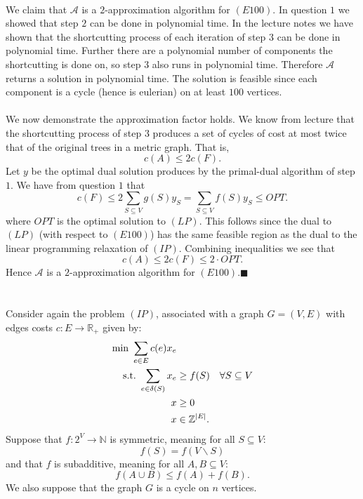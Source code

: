 \documentclass[letterpaper,12pt,oneside,onecolumn]{article}
\newcommand{\N}{\mathbb{N}} \newcommand{\R}{\mathbb{R}}
\newcommand{\cA}{\mathcal{A}} \newcommand{\cB}{\mathcal{B}}
\begin{document}
\paragraph{}
We claim that $\cA$ is a $2$-approximation algorithm for $(E100)$. In question $1$ we showed that step $2$ can be done in polynomial time. In the lecture notes we have shown that the shortcutting process of each iteration of step $3$ can be done in polynomial time. Further there are a polynomial number of components the shortcutting is done on, so step $3$ also runs in polynomial time. Therefore $\cA$ returns a solution in polynomial time. The solution is feasible since each component is a cycle (hence is eulerian) on at least $100$ vertices.
\paragraph{}
We now demonstrate the approximation factor holds. We know from lecture that the shortcutting process of step $3$ produces a set of cycles of cost at most twice that of the original trees in a metric graph. That is,
$$c(A)\leq 2c(F).$$
Let $y$ be the optimal dual solution produces by the primal-dual algorithm of step $1$. We have from question $1$ that
$$c(F) \leq 2\sum_{S\subseteq V} g(S) y_S = \sum_{S\subseteq V} f(S) y_S \leq OPT.$$
where $OPT$ is the optimal solution to $(LP)$. This follows since the dual to $(LP)$ (with respect to $(E100)$) has the same feasible region as the dual to the linear programming relaxation of $(IP)$. Combining inequalities we see that
$$c(A) \leq 2c(F) \leq 2 \cdot OPT.$$
Hence $\cA$ is a $2$-approximation algorithm for $(E100)$.$\blacksquare$

\section{}
\paragraph{}
Consider again the problem $(IP)$, associated with a graph $G=(V,E)$ with edges costs $c: E \rightarrow \R_+$ given by:
\begin{align*}
\min\ \sum_{e\in E} c(e) x_e&\\
\text{s.t.}\  \sum_{e\in\delta(S)} x_e &\geq f(S) &\forall S \subseteq V \\
x&\geq 0 \\
x&\in \mathbb{Z}^{|E|}.
\end{align*}
Suppose that $f:2^V \rightarrow \N$ is symmetric, meaning for all $S\subseteq V$:
$$f(S) = f(V\backslash S)$$
and that $f$ is subadditive, meaning for all $A,B \subseteq V$:
$$f(A\cup B) \leq f(A) + f(B).$$
We also suppose that the graph $G$ is a cycle on $n$ vertices.
\end{document}
